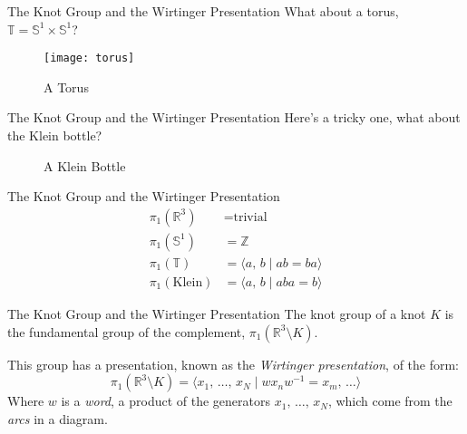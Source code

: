 \documentclass{beamer}
\begin{document}
    \begin{frame}{The Knot Group and the Wirtinger Presentation}
        What about a torus, $\mathbb{T}=\mathbb{S}^{1}\times\mathbb{S}^{1}$?
        \begin{figure}
            \centering
            \texttt{[image: torus]}
            \caption{A Torus}
        \end{figure}
    \end{frame}
    \begin{frame}{The Knot Group and the Wirtinger Presentation}
        Here's a tricky one, what about the Klein bottle?
        \begin{figure}
            \centering
            \caption{A Klein Bottle}
        \end{figure}
    \end{frame}
    \begin{frame}{The Knot Group and the Wirtinger Presentation}
        \begin{align}
            \pi_{1}(\mathbb{R}^{3})
            &=\textrm{trivial}\\
            \pi_{1}(\mathbb{S}^{1})
            &=\mathbb{Z}\\
            \pi_{1}(\mathbb{T})
            &=\langle{a,\,b\;|\;ab=ba}\rangle\\
            \pi_{1}(\textrm{Klein})
            &=\langle{a,\,b\;|\;aba=b}\rangle
        \end{align}
    \end{frame}
    \begin{frame}{The Knot Group and the Wirtinger Presentation}
        The knot group of a knot $K$ is the fundamental group of the
        complement, $\pi_{1}(\mathbb{R}^{3}\setminus{K})$.
        \par\hfil\par
        This group has a presentation, known as the
        \textit{Wirtinger presentation}, of the form:
        \begin{equation}
            \pi_{1}(\mathbb{R}^{3}\setminus{K})
            =\langle
                x_{1},\,\dots,\,x_{N}\;|\;wx_{n}w^{-1}=x_{m},\,\dots
            \rangle
        \end{equation}
        Where $w$ is a \textit{word}, a product of the generators
        $x_{1},\,\dots,\,x_{N}$, which come from the \textit{arcs} in
        a diagram.
    \end{frame}
\end{document}
